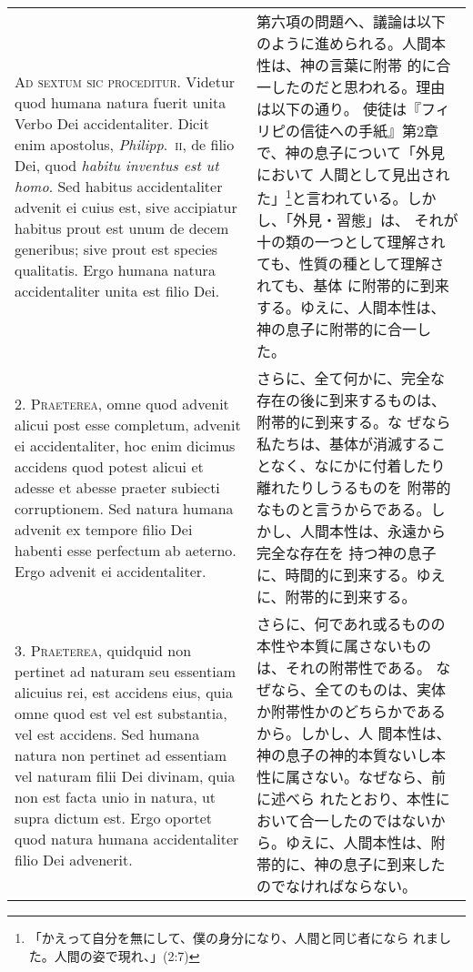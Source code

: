 \documentclass[10pt]{jsarticle} %
\begin{document}
\begin{longtable}{p{21em}p{21em}}
{\scshape Ad sextum sic proceditur}. Videtur quod humana natura fuerit unita Verbo
Dei accidentaliter. Dicit enim apostolus, {\itshape Philipp}.~{\scshape ii}, de filio Dei,
quod {\itshape habitu inventus est ut homo}. Sed habitus accidentaliter advenit ei
cuius est, sive accipiatur habitus prout est unum de decem generibus;
sive prout est species qualitatis. Ergo humana natura accidentaliter
unita est filio Dei.

&

第六項の問題へ、議論は以下のように進められる。人間本性は、神の言葉に附帯
 的に合一したのだと思われる。理由は以下の通り。
使徒は『フィリピの信徒への手紙』第2章で、神の息子について「外見において
 人間として見出された」\footnote{「かえって自分を無にして、僕の身分になり、人間と同じ者になら
 れました。人間の姿で現れ、」(2:7)}と言われている。しかし、「外見・習態」は、
 それが十の類の一つとして理解されても、性質の種として理解されても、基体
 に附帯的に到来する。ゆえに、人間本性は、神の息子に附帯的に合一した。

\\



2. {\scshape Praeterea}, omne quod advenit alicui post esse completum, advenit ei
accidentaliter, hoc enim dicimus accidens quod potest alicui et adesse
et abesse praeter subiecti corruptionem. Sed natura humana advenit ex
tempore filio Dei habenti esse perfectum ab aeterno. Ergo advenit ei
accidentaliter.

&


さらに、全て何かに、完全な存在の後に到来するものは、附帯的に到来する。な
 ぜなら私たちは、基体が消滅することなく、なにかに付着したり離れたりしうるものを
 附帯的なものと言うからである。しかし、人間本性は、永遠から完全な存在を
 持つ神の息子に、時間的に到来する。ゆえに、附帯的に到来する。

\\



3. {\scshape Praeterea}, quidquid non pertinet ad naturam seu essentiam alicuius rei,
est accidens eius, quia omne quod est vel est substantia, vel est
accidens. Sed humana natura non pertinet ad essentiam vel naturam filii
Dei divinam, quia non est facta unio in natura, ut supra dictum
est. Ergo oportet quod natura humana accidentaliter filio Dei advenerit.

&

さらに、何であれ或るものの本性や本質に属さないものは、それの附帯性である。
 なぜなら、全てのものは、実体か附帯性かのどちらかであるから。しかし、人
 間本性は、神の息子の神的本質ないし本性に属さない。なぜなら、前に述べら
 れたとおり、本性において合一したのではないから。ゆえに、人間本性は、附
 帯的に、神の息子に到来したのでなければならない。


\end{longtable}
\end{document}
